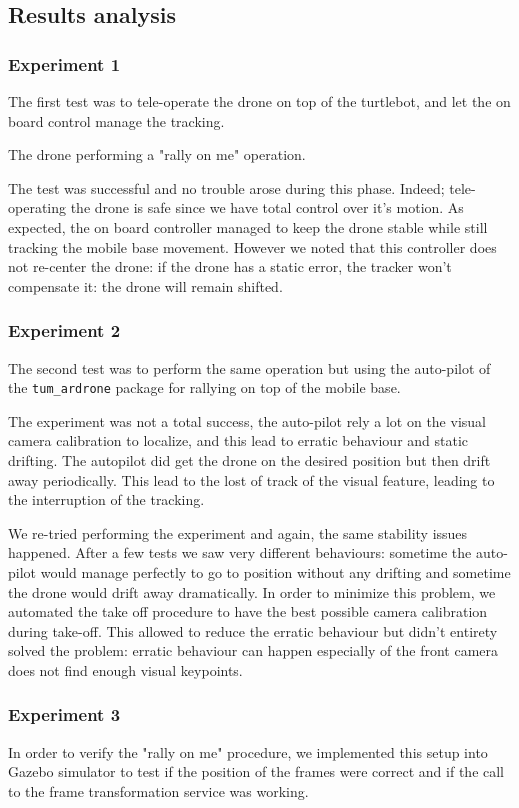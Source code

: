 \documentclass[11pt,a4paper]{article}
\begin{document}
\subsection{Results analysis}
\subsubsection{Experiment 1}
The first test was to tele-operate the drone on top of the turtlebot, and let the on board control
manage the tracking.

The drone performing a "rally on me" operation.

The test was successful and no trouble arose during this phase. Indeed; tele-operating the drone is 
safe since we have total control over it's motion.
As expected, the on board controller managed to keep the drone stable while still tracking the mobile base 
movement. However we noted that this controller does not re-center the drone: if the drone has a static
error, the tracker won't compensate it: the drone will remain shifted.

\subsubsection{Experiment 2}
The second test was to perform the same operation but using the auto-pilot of the \verb!tum_ardrone!
package for rallying on top of the mobile base.

The experiment was not a total success, the auto-pilot rely a lot on the visual camera calibration to 
localize, and this lead to erratic behaviour and static drifting.
The autopilot did get the drone on the desired position but then drift away periodically. This lead to the 
lost of track of the visual feature, leading to the interruption of the tracking.

We re-tried performing the experiment and again, the same stability issues happened. After a few tests we 
saw very different behaviours: sometime the auto-pilot would manage perfectly to go to position without any
drifting and sometime the drone would drift away dramatically. In order to minimize this problem, we 
automated the take off procedure to have the best possible camera calibration during take-off. This 
allowed to reduce the erratic behaviour but didn't entirety solved the problem: erratic behaviour can happen
especially of the front camera does not find enough visual keypoints.

\subsubsection{Experiment 3}
In order to verify the "rally on me" procedure, we implemented this setup into Gazebo simulator to test if
the position of the frames were correct and if the call to the frame transformation service was working.
\end{document}
